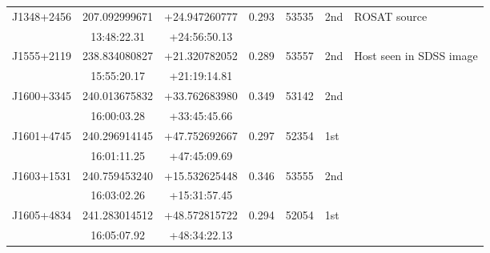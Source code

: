 \begin{table*}
\begin{tabular} {l  cc  cc l l}
\multirow{ 2}{*}{J1348+2456}   &  207.092999671   &  +24.947260777   &  \multirow{ 2}{*}{0.293}    & \multirow{ 2}{*}{53535}    & \multirow{ 2}{*}{2nd}      & ROSAT source \\
                                                 &   13:48:22.31        &  +24:56:50.13       &                                         &                                         &             &     \\ 
\multirow{ 2}{*}{J1555+2119}   &  238.834080827   &  +21.320782052   &  \multirow{ 2}{*}{0.289}    & \multirow{ 2}{*}{53557}    & \multirow{ 2}{*}{2nd}      & Host seen in SDSS image \\
                                                 &  15:55:20.17         &  +21:19:14.81       &                                         &                                         &             &     \\ 
\multirow{ 2}{*}{J1600+3345}   &  240.013675832   &  +33.762683980    &  \multirow{ 2}{*}{0.349}   & \multirow{ 2}{*}{53142}    &  \multirow{ 2}{*}{2nd}     &    \\
                                                 &  16:00:03.28         &  +33:45:45.66        &                                        &                                         &             &     \\ 
\multirow{ 2}{*}{J1601+4745}   &  240.296914145   & +47.752692667     &  \multirow{ 2}{*}{0.297}   & \multirow{ 2}{*}{52354}    &  \multirow{ 2}{*}{1st}      &     \\
                                                 & 16:01:11.25          &  +47:45:09.69         &                                        &                                         &             &     \\    
\multirow{ 2}{*}{J1603+1531}   &  240.759453240   &  +15.532625448     &  \multirow{ 2}{*}{0.346}   & \multirow{ 2}{*}{53555}    &   \multirow{ 2}{*}{2nd}    &    \\
                                                 &  16:03:02.26         &  +15:31:57.45	   &                                         &                                         &             &     \\ 
\multirow{ 2}{*}{J1605+4834}   &  241.283014512   &  +48.572815722     &  \multirow{ 2}{*}{0.294}    & \multirow{ 2}{*}{52054}   &   \multirow{ 2}{*}{1st}    &     \\
                                                 &  16:05:07.92         &  +48:34:22.13         &                                         &                                        &            &      \\ 

\end{tabular}
\end{table*}
